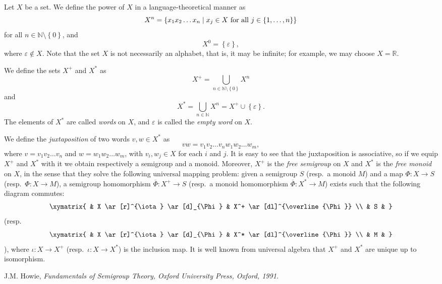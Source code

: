 \documentclass[12pt]{article}
\newcommand{\gbra}[1]{\left\{ #1 \right\}}
\begin{document}
Let $X$ be a set.
We define the power of $X$ in a language-theoretical manner as
\[
  X^n=\gbra{x_1x_2\ldots x_n\mid x_j\in X
  \hbox{ for all }j\in\gbra{1,\ldots,n}}
\]
for all $n\in\mathbb{N}\setminus \gbra{0}$, and
\[
  X^0=\gbra{\varepsilon},
\]
where $\varepsilon\notin X$.
Note that the set $X$ is not necessarily an alphabet,
that is, it may be infinite; for example, we may choose $X=\mathbb{R}$.

We define the sets $X^+$ and $X^*$ as
\[
  X^+=\bigcup_{n\in\mathbb{N}\setminus\gbra{0}}   X^n
\]
and
\[
  X^*=\bigcup_{n\in\mathbb{N}}   X^n  =  X^+\cup\gbra{\varepsilon}.
\]
The elements of $X^*$ are called \emph{words} on $X$,
and $\varepsilon$ is called the \emph{empty word} on $X$.

We define the \emph{juxtaposition} of two words $v,w\in X^*$ as 
\[
  vw=v_1v_2\ldots v_n w_1w_2\ldots w_m,
\]
where $v=v_1v_2\ldots v_n$ and $w=w_1w_2\ldots w_m$,
with $v_i,w_j\in X$ for each $i$ and $j$.
It is easy to see that the juxtaposition is associative,
so if we equip $X^+$ and $X^*$ with it
we obtain respectively a semigroup and a monoid.
Moreover, $X^+$ is the \emph{free semigroup} on $X$ and $X^*$
is the \emph{free monoid} on $X$,
in the sense that they solve the following universal mapping problem:
given a semigroup $S$ (resp.\ a monoid $M$)
and a map $\Phi\colon X\to S$ (resp.\ $\Phi\colon X\to M$),
a semigroup homomorphism $\overline\Phi\colon X^+\to S$
(resp.\ a monoid homomorphism $\overline\Phi\colon X^*\to M$)
exists such that the following diagram commutes:
\[
  \xymatrix{
  & X \ar[r]^{\iota} \ar[d]_{\Phi} & X^+ \ar[dl]^{\overline{\Phi}} \\
  & S &
  }
\]
  (resp. 
\[
  \xymatrix{
  & X \ar[r]^{\iota} \ar[d]_{\Phi} & X^* \ar[dl]^{\overline{\Phi}} \\
  & M &
  }
\]
), where $\iota\colon X\to X^+$ (resp.\ $\iota\colon X\to X^*$)
is the inclusion map.
It is well known from universal algebra
that $X^+$ and $X^*$ are unique up to isomorphism.

\begin{thebibliography}{9}
 J.M. Howie,
 \it{Fundamentals of Semigroup Theory},
 Oxford University Press, Oxford, 1991.
\end{thebibliography}
\end{document}
